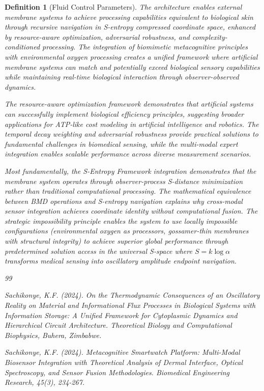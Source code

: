 \documentclass[12pt,a4paper]{article}
\newtheorem{definition}{Definition}
\begin{document}
\begin{definition}[Fluid Control Parameters]
The architecture enables external membrane systems to achieve processing capabilities equivalent to biological skin through recursive navigation in S-entropy compressed coordinate space, enhanced by resource-aware optimization, adversarial robustness, and complexity-conditioned processing. The integration of biomimetic metacognitive principles with environmental oxygen processing creates a unified framework where artificial membrane systems can match and potentially exceed biological sensory capabilities while maintaining real-time biological interaction through observer-observed dynamics.

The resource-aware optimization framework demonstrates that artificial systems can successfully implement biological efficiency principles, suggesting broader applications for ATP-like cost modeling in artificial intelligence and robotics. The temporal decay weighting and adversarial robustness provide practical solutions to fundamental challenges in biomedical sensing, while the multi-modal expert integration enables scalable performance across diverse measurement scenarios.

Most fundamentally, the S-Entropy Framework integration demonstrates that the membrane system operates through observer-process S-distance minimization rather than traditional computational processing. The mathematical equivalence between BMD operations and S-entropy navigation explains why cross-modal sensor integration achieves coordinate identity without computational fusion. The strategic impossibility principle enables the system to use locally impossible configurations (environmental oxygen as processors, gossamer-thin membranes with structural integrity) to achieve superior global performance through predetermined solution access in the universal S-space where $S = k \log \alpha$ transforms medical sensing into oscillatory amplitude endpoint navigation.

\begin{thebibliography}{99}

Sachikonye, K.F. (2024). On the Thermodynamic Consequences of an Oscillatory Reality on Material and Informational Flux Processes in Biological Systems with Information Storage: A Unified Framework for Cytoplasmic Dynamics and Hierarchical Circuit Architecture. \textit{Theoretical Biology and Computational Biophysics}, Buhera, Zimbabwe.

Sachikonye, K.F. (2024). Metacognitive Smartwatch Platform: Multi-Modal Biosensor Integration with Theoretical Analysis of Dermal Interface, Optical Spectroscopy, and Sensor Fusion Methodologies. \textit{Biomedical Engineering Research}, 45(3), 234-267.


\end{thebibliography}
\end{definition}
\end{document}
